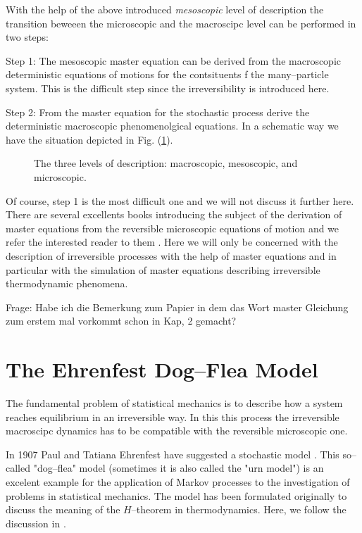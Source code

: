 With the help of the above introduced \textit{mesoscopic} level of description
the transition beweeen the microscopic and the macroscipc level can be
performed in two steps:

Step 1: The mesoscopic master equation can be derived from the macroscopic
deterministic equations of motions for the contsituents f the many--particle
system. This is the difficult step since the irreversibility is introduced
here. 

Step 2: From the master equation for the stochastic process derive the
deterministic macroscopic phenomenolgical equations. In a schematic way we
have the situation depicted in Fig. (\ref{fig:MasterSchema}).

\begin{figure}[htbp]
 \label{fig:MasterSchema} 
 \begin{center}
    
    \caption{The three levels of description: macroscopic, mesoscopic, 
and microscopic.}
    
  \end{center}
\end{figure}

Of course, step 1 is the most difficult one and we will not discuss it further
here. There are several excellents books introducing the subject of the
derivation of master equations from the reversible microscopic equations of
motion and we refer the interested reader to them
\cite{Prigogine,Kreuzer,McLennan}. 
Here we will only be
concerned with the description of irreversible processes with the 
help of master equations and in particular with the simulation of 
master equations describing
irreversible thermodynamic phenomena. 

Frage: Habe ich die Bemerkung zum Papier in dem das Wort master Gleichung zum
erstem mal vorkommt schon in Kap, 2 gemacht?


\section{The Ehrenfest Dog--Flea Model}
\label{sec:EhrenfestModel}
The fundamental problem of statistical mechanics is to describe 
how a system reaches
equilibrium in an irreversible way. In this this process the irreversible
macroscipc dynamics has to be compatible with the reversible microscopic one.

In 1907 Paul and Tatiana Ehrenfest have suggested a stochastic model
\cite{Ehrenfest}. This so--called "dog--flea" model (sometimes it is also
called the "urn model") is an excelent example for the application of Markov
processes to the investigation of problems in statistical mechanics. The model
has been formulated originally to discuss the meaning of the $H$--theorem in
thermodynamics. Here, we follow the discussion in \cite{Jancel,KacLogan}.


